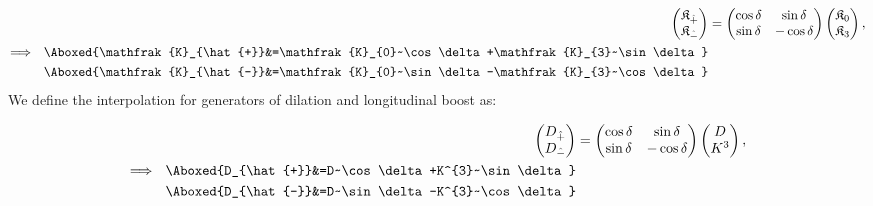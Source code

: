 \documentclass[]{article}
\numberwithin{equation}{section}
\begin{document}
{{\begin{align}
\begin{pmatrix}
    \mathfrak{K}_{\hat{+}}\\
    \mathfrak{K}_{\hat{-}}
  \end{pmatrix}&=
  \begin{pmatrix}
    \cos\delta   & \sin\delta \\
    \sin\delta   & -\cos\delta
  \end{pmatrix}
  \begin{pmatrix}
    \mathfrak{K}_{0}\\
    \mathfrak{K}_{3}
  \end{pmatrix},\\
\Longrightarrow~~\Aboxed{\mathfrak{K}_{\hat{+}}&=\mathfrak{K}_{0}~\cos\delta+\mathfrak{K}_{3}~\sin\delta}\\
\Aboxed{\mathfrak{K}_{\hat{-}}&=\mathfrak{K}_{0}~\sin\delta-\mathfrak{K}_{3}~\cos\delta}
\end{align}
We define the interpolation for generators of dilation and longitudinal boost as:

\begin{align}
\begin{pmatrix}
    D_{\hat{+}}\\
    D_{\hat{-}}
  \end{pmatrix}&=
  \begin{pmatrix}
    \cos\delta   & \sin\delta \\
    \sin\delta   & -\cos\delta
  \end{pmatrix}
  \begin{pmatrix}
    D\\
    K^{3}
  \end{pmatrix},\\
\Longrightarrow~~\Aboxed{D_{\hat{+}}&=D~\cos\delta+K^{3}~\sin\delta}\\
\Aboxed{D_{\hat{-}}&=D~\sin\delta-K^{3}~\cos\delta}
\end{align}
}}
\end{document}
